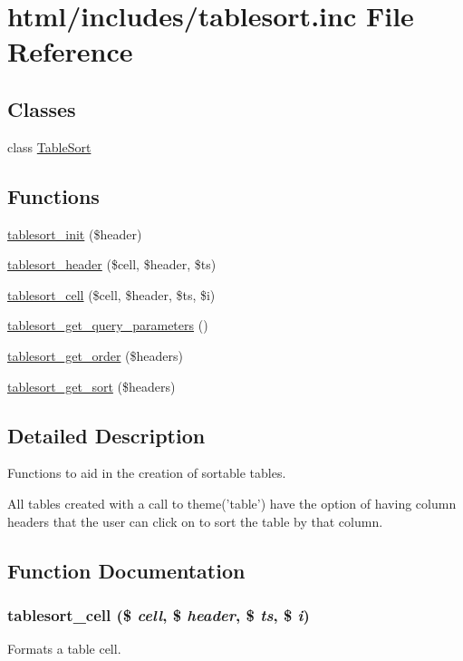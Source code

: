 \hypertarget{tablesort_8inc}{
\section{html/includes/tablesort.inc File Reference}
\label{tablesort_8inc}
}
\subsection*{Classes}
\begin{DoxyCompactItemize}
\item 
class \hyperlink{classTableSort}{TableSort}
\end{DoxyCompactItemize}
\subsection*{Functions}
\begin{DoxyCompactItemize}
\item 
\hyperlink{tablesort_8inc_afee7fc97d83c8e51399e9b41ccbae927}{tablesort\_\-init} (\$header)
\item 
\hyperlink{tablesort_8inc_a9c93c8e235c5013f0f494ba207ec1bdf}{tablesort\_\-header} (\$cell, \$header, \$ts)
\item 
\hyperlink{tablesort_8inc_a32db61218906caa4bd22dffeb6bd5e00}{tablesort\_\-cell} (\$cell, \$header, \$ts, \$i)
\item 
\hyperlink{tablesort_8inc_a25f3317225870d1ed7dea582f57dd950}{tablesort\_\-get\_\-query\_\-parameters} ()
\item 
\hyperlink{tablesort_8inc_a185527ebc6d0d3f4b8681b60debddf21}{tablesort\_\-get\_\-order} (\$headers)
\item 
\hyperlink{tablesort_8inc_ae0824a39d518b2e6dc8e603093be2146}{tablesort\_\-get\_\-sort} (\$headers)
\end{DoxyCompactItemize}


\subsection{Detailed Description}
Functions to aid in the creation of sortable tables.

All tables created with a call to theme('table') have the option of having column headers that the user can click on to sort the table by that column. 

\subsection{Function Documentation}
\hypertarget{tablesort_8inc_a32db61218906caa4bd22dffeb6bd5e00}{
\subsubsection[{tablesort\_\-cell}]{\setlength{\rightskip}{0pt plus 5cm}tablesort\_\-cell (\$ {\em cell}, \/  \$ {\em header}, \/  \$ {\em ts}, \/  \$ {\em i})}}
\label{tablesort_8inc_a32db61218906caa4bd22dffeb6bd5e00}
Formats a table cell.

